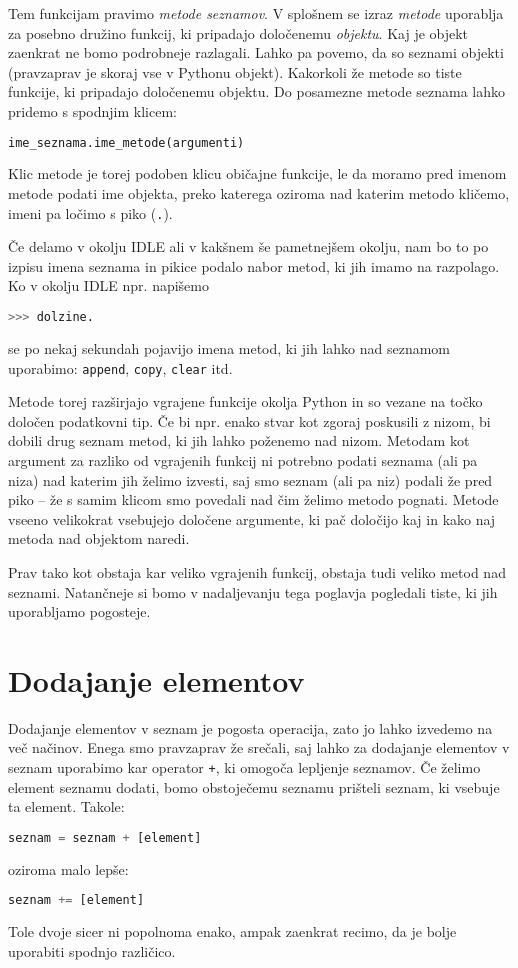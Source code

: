 Tem funkcijam pravimo \emph{metode seznamov}. V splošnem se izraz \emph{metode} uporablja za posebno družino funkcij, ki pripadajo določenemu \emph{objektu}. Kaj je objekt zaenkrat ne bomo podrobneje razlagali. Lahko pa povemo, da so seznami objekti (pravzaprav je skoraj vse v Pythonu objekt). Kakorkoli že metode so tiste funkcije, ki pripadajo določenemu objektu. Do posamezne metode seznama lahko pridemo s spodnjim klicem:
\begin{lstlisting}[language=Python]
ime_seznama.ime_metode(argumenti)
\end{lstlisting}
Klic metode je torej podoben klicu običajne funkcije, le da moramo pred imenom metode podati ime objekta, preko katerega oziroma nad katerim metodo kličemo, imeni pa ločimo s piko (\texttt{.}).

Če delamo v okolju IDLE ali v kakšnem še pametnejšem okolju, nam bo to po izpisu imena seznama in pikice podalo nabor metod, ki jih imamo na razpolago. Ko v okolju IDLE npr. napišemo
\begin{lstlisting}[language=Python]
>>> dolzine.
\end{lstlisting}
se po nekaj sekundah pojavijo imena metod, ki jih lahko nad seznamom uporabimo: \texttt{append}, \texttt{copy}, \texttt{clear} itd.

Metode torej razširjajo vgrajene funkcije okolja Python in so vezane na točko določen podatkovni tip. Če bi npr. enako stvar kot zgoraj poskusili z nizom, bi dobili drug seznam metod, ki jih lahko poženemo nad nizom. Metodam kot argument za razliko od vgrajenih funkcij ni potrebno podati seznama (ali pa niza) nad katerim jih želimo izvesti, saj smo seznam (ali pa niz) podali že pred piko -- že s samim klicom smo povedali nad čim želimo metodo pognati. Metode vseeno velikokrat vsebujejo določene argumente, ki pač določijo kaj in kako naj metoda nad objektom naredi. 

Prav tako kot obstaja kar veliko vgrajenih funkcij, obstaja tudi veliko metod nad seznami. Natančneje si bomo v nadaljevanju tega poglavja pogledali tiste, ki jih uporabljamo pogosteje.

\section{Dodajanje elementov}

Dodajanje elementov v seznam je pogosta operacija, zato jo lahko izvedemo na več načinov. Enega smo pravzaprav že srečali, saj lahko za dodajanje elementov v seznam uporabimo kar operator \texttt{+}, ki omogoča lepljenje seznamov. Če želimo element seznamu dodati, bomo obstoječemu seznamu prišteli seznam, ki vsebuje ta element. Takole:
\begin{lstlisting}[language=Python]
seznam = seznam + [element]
\end{lstlisting}
oziroma malo lepše:
\begin{lstlisting}[language=Python]
seznam += [element]
\end{lstlisting}
Tole dvoje sicer ni popolnoma enako, ampak zaenkrat recimo, da je bolje uporabiti spodnjo različico. 

